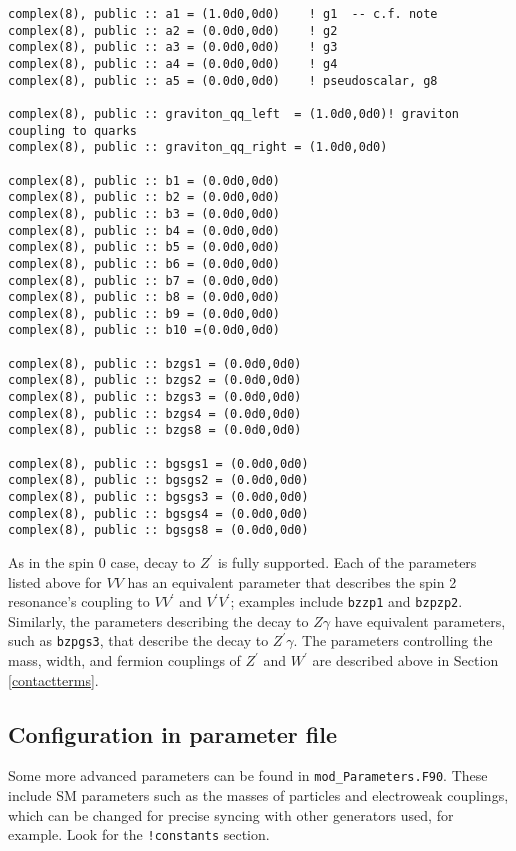 \documentclass[aps,superscriptaddress,nofootinbib]{revtex4}
\begin{document}
\begin{verbatim}
complex(8), public :: a1 = (1.0d0,0d0)    ! g1  -- c.f. note
complex(8), public :: a2 = (0.0d0,0d0)    ! g2
complex(8), public :: a3 = (0.0d0,0d0)    ! g3
complex(8), public :: a4 = (0.0d0,0d0)    ! g4
complex(8), public :: a5 = (0.0d0,0d0)    ! pseudoscalar, g8

complex(8), public :: graviton_qq_left  = (1.0d0,0d0)! graviton coupling to quarks
complex(8), public :: graviton_qq_right = (1.0d0,0d0)

complex(8), public :: b1 = (0.0d0,0d0)
complex(8), public :: b2 = (0.0d0,0d0)
complex(8), public :: b3 = (0.0d0,0d0)
complex(8), public :: b4 = (0.0d0,0d0)
complex(8), public :: b5 = (0.0d0,0d0)
complex(8), public :: b6 = (0.0d0,0d0)
complex(8), public :: b7 = (0.0d0,0d0)
complex(8), public :: b8 = (0.0d0,0d0)
complex(8), public :: b9 = (0.0d0,0d0)
complex(8), public :: b10 =(0.0d0,0d0)

complex(8), public :: bzgs1 = (0.0d0,0d0)
complex(8), public :: bzgs2 = (0.0d0,0d0)
complex(8), public :: bzgs3 = (0.0d0,0d0)
complex(8), public :: bzgs4 = (0.0d0,0d0)
complex(8), public :: bzgs8 = (0.0d0,0d0)

complex(8), public :: bgsgs1 = (0.0d0,0d0)
complex(8), public :: bgsgs2 = (0.0d0,0d0)
complex(8), public :: bgsgs3 = (0.0d0,0d0)
complex(8), public :: bgsgs4 = (0.0d0,0d0)
complex(8), public :: bgsgs8 = (0.0d0,0d0)
\end{verbatim}

As in the spin 0 case, decay to $Z^\prime$ is fully supported.  Each of the parameters listed above for $VV$ has an equivalent parameter that describes the spin 2 resonance's coupling to $VV^\prime$ and $V^\prime V^\prime$; examples include \verb|bzzp1| and \verb|bzpzp2|.  Similarly, the parameters describing the decay to $Z\gamma$ have equivalent parameters, such as \verb|bzpgs3|, that describe the decay to $Z^\prime\gamma$.  The parameters controlling the mass, width, and fermion couplings of $Z^\prime$ and $W^\prime$ are described above in Section \ref{contactterms}.

\subsection{Configuration in parameter file}

Some more advanced parameters can be found in \verb|mod_Parameters.F90|.  These include SM parameters such as the masses of particles and electroweak couplings, which can be changed for precise syncing with other generators used, for example.  Look for the \verb|!constants| section.
\end{document}
